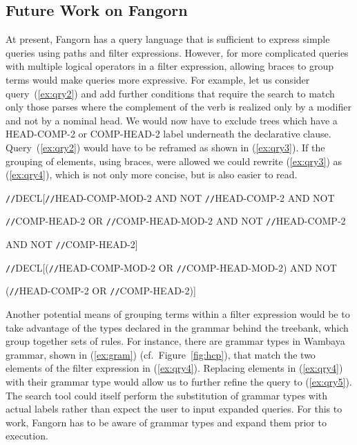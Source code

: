 
\subsection{Future Work on Fangorn}
\label{sec:fangorn-fut}


At present, Fangorn has a query language that is sufficient to express
simple queries using paths and filter expressions. However, for more complicated 
queries with multiple logical operators in a filter expression, allowing
braces to group terms would make queries more expressive.
For example, let us consider query~(\ref{ex:qry2})
and add further conditions that require the search to match only those parses 
where the complement of the verb is realized only by a modifier and not by a
nominal head. We would now have to exclude trees which have a {\small HEAD-COMP-2}
or {\small COMP-HEAD-2} label underneath the declarative clause. Query~(\ref{ex:qry2})
would have to be reframed as shown in (\ref{ex:qry3}). If the grouping of elements,
using braces, were allowed we could rewrite (\ref{ex:qry3}) as (\ref{ex:qry4}), 
which is not only more concise, but is also easier to read. 

\begin{exe}
\ex\label{ex:qry3}\small
\verb=//=DECL[\verb=//=HEAD-COMP-MOD-2 AND NOT \verb=//=HEAD-COMP-2 AND NOT 

\verb=//=COMP-HEAD-2 OR \verb=//=COMP-HEAD-MOD-2  AND NOT \verb=//=HEAD-COMP-2 

AND NOT \verb=//=COMP-HEAD-2]
\end{exe}
\begin{exe}
\ex\label{ex:qry4}\small
\verb=//=DECL[(\verb=//=HEAD-COMP-MOD-2 OR \verb=//=COMP-HEAD-MOD-2) AND NOT

 (\verb=//=HEAD-COMP-2 OR \verb=//=COMP-HEAD-2)]
\end{exe}

Another potential means of grouping terms within a filter expression
would be to take advantage of the types declared in the grammar behind
the treebank, which group together sets of rules.
For instance, there are grammar types in Wambaya grammar, shown in (\ref{ex:gram}) (cf.\ Figure~\ref{fig:hcp}), that 
match the two elements of the filter expression in (\ref{ex:qry4}). Replacing elements in (\ref{ex:qry4}) with their grammar type would allow us to further refine the query to (\ref{ex:qry5}). 
The search tool could itself perform the substitution of grammar types with actual labels 
rather than expect the user to input expanded queries. For this to work, Fangorn 
has to be aware of grammar types and expand them prior to execution.

